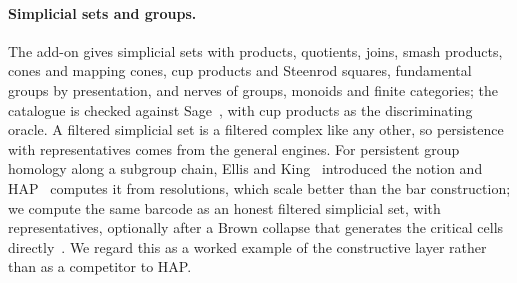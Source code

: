 \paragraph{Simplicial sets and groups.}
The  add-on gives simplicial sets with products, quotients, joins, smash products, cones and mapping cones, cup products
and Steenrod squares, fundamental groups by presentation, and nerves of groups, monoids and finite categories; the catalogue is
checked against Sage~\cite{sagemath}, with cup products as the discriminating oracle. A filtered simplicial set is a
filtered complex like any other, so persistence with representatives comes from the general engines. For persistent group
homology along a subgroup chain, Ellis and King~\cite{ellis2011persistent} introduced the notion and HAP~\cite{hap}
computes it from resolutions, which scale better than the bar construction; we compute the same barcode as an
honest filtered simplicial set, with representatives, optionally after a Brown collapse that generates the critical cells
directly~\cite{brown1992geometry,anick1986homology}. We regard this as a worked example of the constructive layer rather than as a
competitor to HAP.
